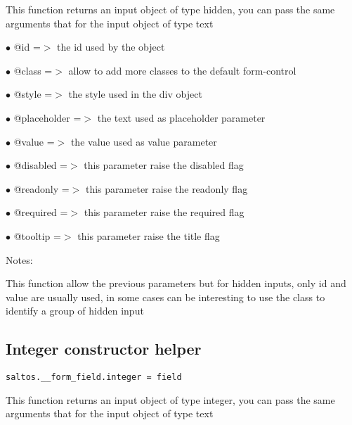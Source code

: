 \documentclass[a4paper]{book}
\begin{document}
This function returns an input object of type hidden, you can pass the same arguments
that for the input object of type text

\begin{compactitem}
\item[\color{myblue}$\bullet$] @id          =$>$ the id used by the object
\item[\color{myblue}$\bullet$] @class       =$>$ allow to add more classes to the default form-control
\item[\color{myblue}$\bullet$] @style       =$>$ the style used in the div object
\item[\color{myblue}$\bullet$] @placeholder =$>$ the text used as placeholder parameter
\item[\color{myblue}$\bullet$] @value       =$>$ the value used as value parameter
\item[\color{myblue}$\bullet$] @disabled    =$>$ this parameter raise the disabled flag
\item[\color{myblue}$\bullet$] @readonly    =$>$ this parameter raise the readonly flag
\item[\color{myblue}$\bullet$] @required    =$>$ this parameter raise the required flag
\item[\color{myblue}$\bullet$] @tooltip     =$>$ this parameter raise the title flag
\end{compactitem}

Notes:

This function allow the previous parameters but for hidden inputs, only id
and value are usually used, in some cases can be interesting to use the
class to identify a group of hidden input

\hypertarget{toc376}{}
\subsection{Integer constructor helper}

\begin{lstlisting}
saltos.__form_field.integer = field
\end{lstlisting}

This function returns an input object of type integer, you can pass the same arguments
that for the input object of type text
\end{document}
